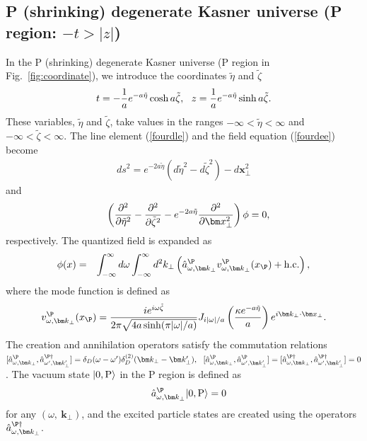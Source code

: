 \documentclass[aps,prd,preprintnumbers,nofootinbib,showpacs]{revtex4}%
\begin{document}
\begin{widetext}
\subsection{P (shrinking) degenerate Kasner universe (P region: $-t>|z|$)}
In the P (shrinking) degenerate Kasner universe (P region in Fig.~\ref{fig:coordinate}),
we introduce the coordinates $\tilde\eta$ and $\tilde\zeta$ 
\begin{eqnarray}
t=-{1\over a}e^{-a\tilde\eta}\cosh a\tilde\zeta,~~
z={1\over a}e^{-a\tilde\eta}\sinh a\tilde\zeta.
\end{eqnarray}
These variables, $\tilde\eta$ and $\tilde\zeta$, take values in the ranges $-\infty<\tilde\eta<\infty$ and 
$-\infty<\tilde\zeta<\infty$. The line element (\ref{fourdle}) and
the field equation (\ref{fourdee}) become
\begin{eqnarray}
ds^2=e^{-2a\tilde\eta}(d\tilde\eta^2-d\tilde \zeta^2)-d\bm x_\perp^2
\end{eqnarray}
and 
\begin{eqnarray}
&&\left({\partial^2\over \partial \tilde\eta^2}-{\partial^2\over \partial \tilde\zeta^2}
-e^{-2a\tilde\eta}{\partial^2\over \partial \bm x_\perp^2}\right)\phi=0,
\label{fourdeP}
\end{eqnarray}
respectively. The quantized field is expanded as
\begin{eqnarray}
  \phi(x) &=&\int_{-\infty}^{\infty} d \omega\int_{-\infty}^{\infty} d^2 k_\perp \left( {\hat a}_{\omega,{\bm k}_\perp}^\P
  v_{\omega,{\bm k}_\perp}^\P(x_\P)
+{\rm h.c.}
\right),
\label{qfP}
\end{eqnarray}
where the mode function is defined as
\begin{eqnarray}
v_{\omega,{\bm k}_\perp}^\P(x_\P)={ie^{i\omega \tilde\zeta}\over 2\pi\sqrt{4a\sinh (\pi |\omega|/a)}}
J_{i|\omega|/a}\left({\kappa e^{-a\tilde\eta}\over a}\right)
e^{i\bm k_\perp\cdot \bm x_\perp}.
\label{qfPP}
\end{eqnarray}
The creation and annihilation operators satisfy the commutation relations
$[{\hat a}^\P_{\omega,\bm k_\perp}, {\hat a}_{\omega',\bm k_\perp'}^{\P\dagger}]
=\delta_D(\omega-\omega') \delta_D^{(2)}(\bm k_\perp-\bm k_\perp'), 
~~
[{\hat a}^\P_{\omega,\bm k_\perp}, {\hat a}_{\omega',\bm k_\perp'}^\P]
=[{\hat a}^{\P\dagger}_{\omega,\bm k_\perp}, {\hat a}_{\omega',\bm k_\perp'}^{\P\dagger}]
=0$. 
The vacuum state $|0,{\rm P}\rangle$ in the P region is defined as 
\begin{eqnarray}
&&
\hat a_{\omega,\bm k_\perp}^\P|0,{\rm P}\rangle=0
\label{fourdPvauum}
\end{eqnarray}
for any $(\omega,~\bm k_\perp)$, and the excited particle states are created 
using the operators $\hat a_{\omega,\bm k_\perp}^{\P\dagger}$. 


\end{widetext}
\end{document}
